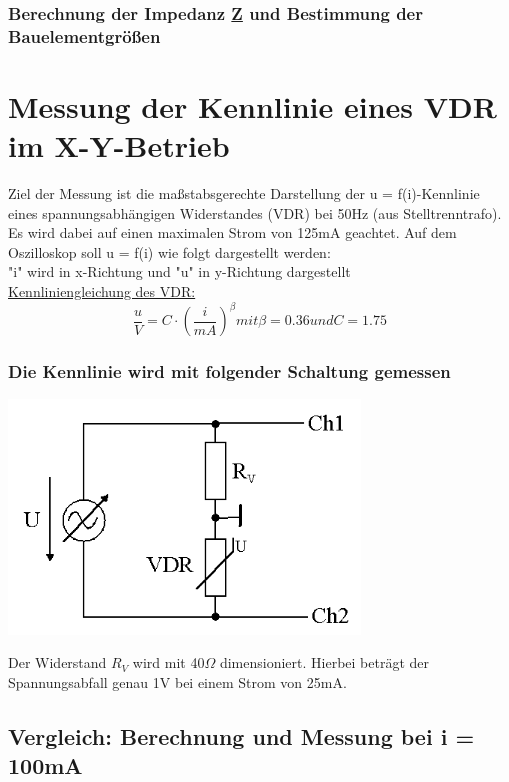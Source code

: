 \documentclass[11pt,a4paper,titlepage]{article}
\begin{document}
\subsubsection{Berechnung der Impedanz \underline{Z} und Bestimmung der Bauelementgr\"o\ss{}en}

\newpage
\section{Messung der Kennlinie eines VDR im X-Y-Betrieb}
Ziel der Messung ist die ma\ss{}stabsgerechte Darstellung der u = f(i)-Kennlinie eines spannungsabh\"angigen Widerstandes (VDR) bei 50Hz (aus Stelltrenntrafo). Es wird dabei auf einen maximalen Strom von 125mA geachtet. Auf dem Oszilloskop soll u = f(i) wie folgt dargestellt werden: \\[1ex] 
"i" wird in x-Richtung und "u" in y-Richtung dargestellt \\

\underline{Kennliniengleichung des VDR:} \\[1ex]
\begin{equation}\label{vdr}
\frac{u}{V}=C\cdot(\frac{i}{mA})^{\beta} mit \beta = 0.36 und C = 1.75 
\end{equation}
\subsubsection*{Die Kennlinie wird mit folgender Schaltung gemessen}
\begin{center}
\includegraphics[width=0.7\textwidth]{gep2v5_2}
\end{center}
Der Widerstand $R_V$ wird mit 40$\Omega$ dimensioniert. Hierbei betr\"agt der Spannungsabfall genau 1V bei einem Strom von 25mA.
\newpage
\subsection{Vergleich: Berechnung und Messung bei i = 100mA}
\end{document}
